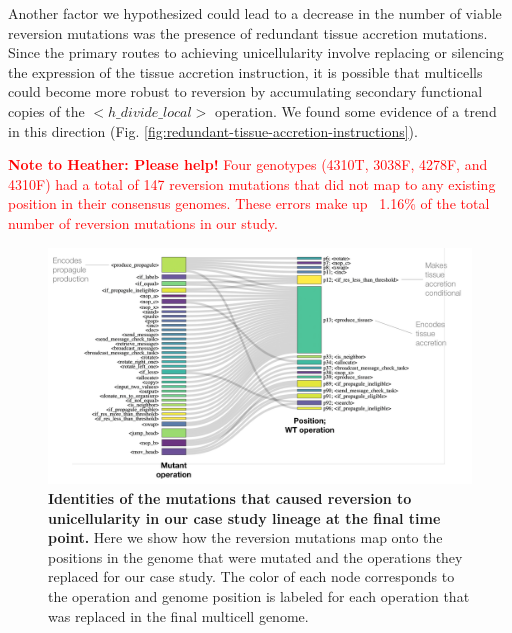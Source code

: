 \documentclass[
]{book}
\begin{document}
Another factor we hypothesized could lead to a decrease in the number of viable reversion mutations was the presence of redundant tissue accretion mutations. Since the primary routes to achieving unicellularity involve replacing or silencing the expression of the tissue accretion instruction, it is possible that multicells could become more robust to reversion by accumulating secondary functional copies of the \(<h\_divide\_local>\) operation. We found some evidence of a trend in this direction (Fig. \ref{fig:redundant-tissue-accretion-instructions}).

\textcolor{red}{\textbf{Note to Heather: Please help!} Four genotypes (4310T, 3038F, 4278F, and 4310F) had a total of 147 reversion mutations that did not map to any existing position in their consensus genomes. These errors make up ~1.16\% of the total number of reversion mutations in our study.}

\begin{figure}
\centering
\includegraphics{images/Final_case_study_mutation_network_30DEC22.png}
\caption{\label{fig:case-study-reversion-mutation-identities}\textbf{Identities of the mutations that caused reversion to unicellularity in our case study lineage at the final time point.} Here we show how the reversion mutations map onto the positions in the genome that were mutated and the operations they replaced for our case study. The color of each node corresponds to the operation and genome position is labeled for each operation that was replaced in the final multicell genome.}
\end{figure}
\end{document}
